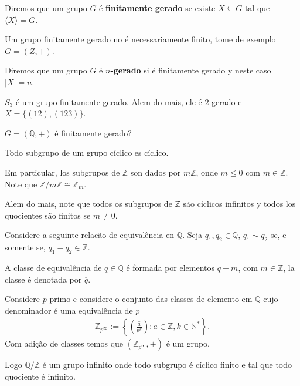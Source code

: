 \begin{definition}
  Diremos que um grupo $G$ é \textbf{finitamente gerado} se existe $X\subseteq G$ tal que $\langle X \rangle=G$.
\end{definition}
Um grupo finitamente gerado no é necessariamente finito, tome de exemplo $G=(Z,+)$.
\begin{notation}[$n$-gerado]
  Diremos que um grupo $G$ é \textbf{$n$-gerado} si é finitamente gerado y neste caso $|X|=n$. 
\end{notation}
\begin{example}
  $S_3$ é um grupo finitamente gerado. Alem do mais, ele é $2$-gerado e $X=\{(12),(123)\}$. 
\end{example}
\begin{note}
  $G=(\mathbb{Q},+)$ é finitamente gerado? 
\end{note}
\begin{note}
  Todo subgrupo de um grupo cíclico es cíclico.

  Em particular, los subgrupos de $\mathbb{Z}$ son dados por $m\mathbb{Z}$, onde $m\leq 0$ com $m\in \mathbb{Z}$. Note que $\mathbb{Z}/m\mathbb{Z}\cong \mathbb{Z}_{m}$.

  Alem do mais, note que todos os subgrupos de $\mathbb{Z}$ são cíclicos infinitos y todos los quocientes são finitos se $m\neq 0$. 
\end{note}
\begin{example}
  Considere a seguinte relacão de equivalência en $\mathbb{Q}$. Seja $q_1,q_2\in\mathbb{Q}$, $q_1\sim q_2$ se, e somente se, $q_1-q_2\in\mathbb{Z}$.

  A classe de equivalência de $q\in\mathbb{Q}$ é formada por elementos $q+m$, com $m\in\mathbb{Z}$, la classe é denotada por $\overline{q}$.

  Considere $p$ primo e considere o conjunto das classes de elemento em $\mathbb{Q}$ cujo denominador é uma equivalência de $p$
  \begin{align*}
    \mathbb{Z}_{p^{\infty}}:=\left\{ \left( \overline{\frac{a}{p^{k}}} \right): a\in\mathbb{Z},k\in\mathbb{N}^{*} \right\}.
  \end{align*}
  Com adição de classes temos que $(\mathbb{Z}_{p^{\infty}},+)$ é um grupo.

  Logo $\mathbb{Q}/\mathbb{Z}$ é um grupo infinito onde todo subgrupo é cíclico finito e tal que todo quociente é infinito. 
\end{example}
